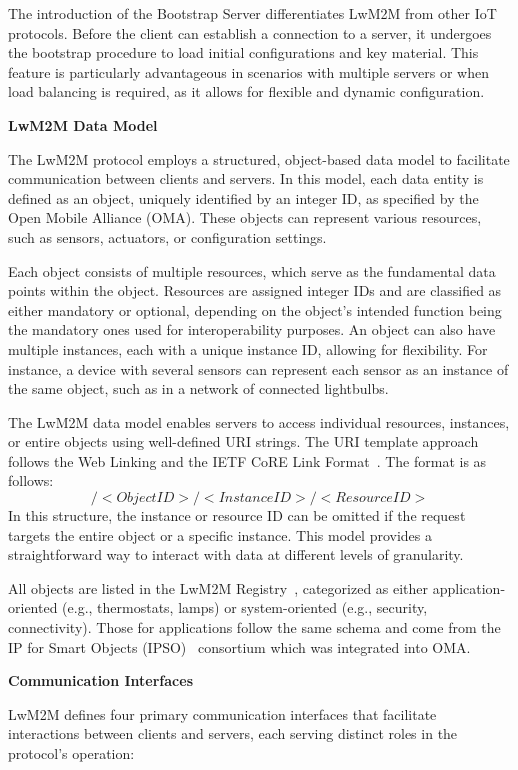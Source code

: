 \documentclass[11pt,sigconf]{iabart}
\begin{document}
The introduction of the Bootstrap Server differentiates LwM2M from other IoT protocols. Before the client can establish a connection to a server, it undergoes the bootstrap procedure to load initial configurations and key material. This feature is particularly advantageous in scenarios with multiple servers or when load balancing is required, as it allows for flexible and dynamic configuration.

\textbf{LwM2M Data Model}

The LwM2M protocol employs a structured, object-based data model to facilitate communication between clients and servers. In this model, each data entity is defined as an object, uniquely identified by an integer ID, as specified by the Open Mobile Alliance (OMA). These objects can represent various resources, such as sensors, actuators, or configuration settings.

Each object consists of multiple resources, which serve as the fundamental data points within the object. Resources are assigned integer IDs and are classified as either mandatory or optional, depending on the object's intended function being the mandatory ones used for interoperability purposes. An object can also have multiple instances, each with a unique instance ID, allowing for flexibility. For instance, a device with several sensors can represent each sensor as an instance of the same object, such as in a network of connected lightbulbs.

The LwM2M data model enables servers to access individual resources, instances, or entire objects using well-defined URI strings. The URI template approach follows the Web Linking and the IETF CoRE Link Format~\cite{rfc6690}. The format is as follows:
\[
/<Object ID>/<Instance ID>/<Resource ID>
\]
In this structure, the instance or resource ID can be omitted if the request targets the entire object or a specific instance. This model provides a straightforward way to interact with data at different levels of granularity.

All objects are listed in the LwM2M Registry~\cite{lwm2m-registry}, categorized as either application-oriented (e.g., thermostats, lamps) or system-oriented (e.g., security, connectivity). Those for applications follow the same schema and come from the IP for Smart Objects (IPSO)~\cite{ipso} consortium which was integrated into OMA. 

\textbf{Communication Interfaces}

LwM2M defines four primary communication interfaces that facilitate interactions between clients and servers, each serving distinct roles in the protocol's operation:
\end{document}
